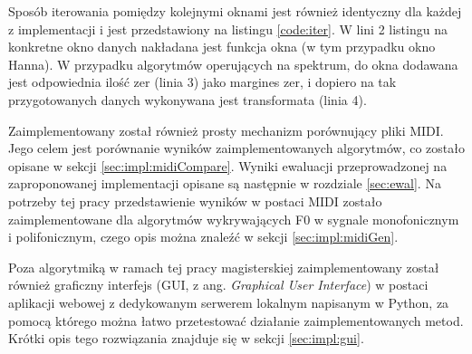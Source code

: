 \documentclass[12pt,a4paper,twoside]{mwart}
\begin{document}
Sposób iterowania pomiędzy kolejnymi oknami jest również identyczny dla każdej z implementacji i jest przedstawiony na listingu \ref{code:iter}. W lini 2 listingu na konkretne okno danych nakładana jest funkcja okna (w tym przypadku okno Hanna). W przypadku algorytmów operujących na spektrum, do okna dodawana jest odpowiednia ilość zer (linia 3) jako margines zer, i dopiero na tak przygotowanych danych wykonywana jest transformata (linia 4).

Zaimplementowany został również prosty mechanizm porównujący pliki MIDI. Jego celem jest porównanie wyników zaimplementowanych algorytmów, co zostało opisane w sekcji \ref{sec:impl:midiCompare}. Wyniki ewaluacji przeprowadzonej na zaproponowanej implementacji opisane są następnie w rozdziale \ref{sec:ewal}. Na potrzeby tej pracy przedstawienie wyników w postaci MIDI zostało zaimplementowane dla algorytmów wykrywających F0 w sygnale monofonicznym i polifonicznym, czego opis można znaleźć w sekcji \ref{sec:impl:midiGen}.

Poza algorytmiką w ramach tej pracy magisterskiej zaimplementowany został również graficzny interfejs (GUI, z ang. \textit{Graphical User Interface}) w postaci aplikacji webowej z dedykowanym serwerem lokalnym napisanym w Python, za pomocą którego można łatwo przetestować działanie zaimplementowanych metod. Krótki opis tego rozwiązania znajduje się w sekcji \ref{sec:impl:gui}.
\end{document}
